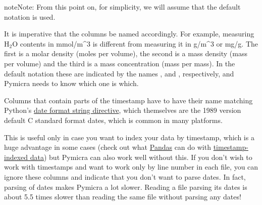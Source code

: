 \documentclass[a4paper,10pt,oneside]{sphinxmanual}
\begin{document}
\begin{notice}{note}{Note:}
From this point on, for simplicity,  we will assume that the default notation is used.
\end{notice}

It is imperative that the columns be named accordingly. For example, measuring
H$_{\text{2}}$O contents in mmol/m\textasciicircum{}3 is different from measuring it in g/m\textasciicircum{}3 or mg/g. The
first is a molar density (moles per volume), the second is a mass density (mass
per volume) and the third is a mass concentration (mass per mass). In the
default notation these are indicated by the names , 
and , respectively, and Pymicra needs to know which one is which.

Columns that contain parts of the timestamp have to have their name matching
Python's \href{https://docs.python.org/2/library/datetime.html\#strftime-and-strptime-behavior}{date format string directive},
which themselves are the 1989 version default C standard format dates, which is
common in many platforms.

This is useful only in case you want to index your data by timestamp, which is
a huge advantage in some cases (check out what \href{http://pandas.pydata.org/}{Pandas} can do with
\href{http://pandas.pydata.org/pandas-docs/stable/timeseries.html}{timestamp-indexed data}) but Pymicra
can also work well without this. If you don't wish to work with timestamps and
want to work only by line number in each file, you can ignore these columns and
indicate that you don't want to parse dates. In fact, parsing of dates makes
Pymicra a lot slower. Reading a file parsing its dates is about 5.5 times
slower than reading the same file without parsing any dates!
\end{document}
